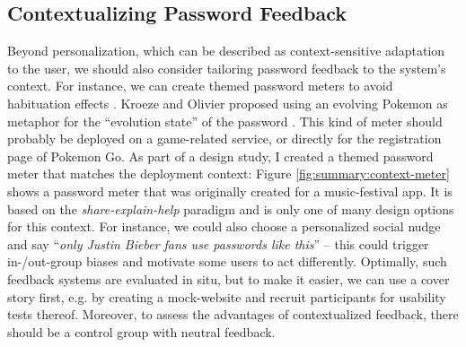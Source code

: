 \subsection{Contextualizing Password Feedback}
Beyond personalization, which can be described as context-sensitive adaptation to the user, we should also consider tailoring password feedback to the system's context. For instance, we can create themed password meters to avoid habituation effects \cite{Ur2012HelpingUsersCreateBetterPasswords}. Kroeze and Olivier proposed using an evolving Pokemon as metaphor for the ``evolution state'' of the password \cite{Kroeze2012GamifyingAuthentication}. This kind of meter should probably be deployed on a game-related service, or directly for the registration page of Pokemon Go. As part of a design study, I created a themed password meter that matches the deployment context: Figure \ref{fig:summary:context-meter} shows a password meter that was originally created for a music-festival app. It is based on the \textit{share-explain-help} paradigm and is only one of many design options for this context. For instance, we could also choose a personalized social nudge and say ``\textit{only Justin Bieber fans use passwords like this}'' -- this could trigger in-/out-group biases and motivate some users to act differently. Optimally, such feedback systems are evaluated in situ, but to make it easier, we can use a cover story first, e.g. by creating a mock-website and recruit participants for usability tests thereof. Moreover, to assess the advantages of contextualized feedback, there should be a control group with neutral feedback.  


